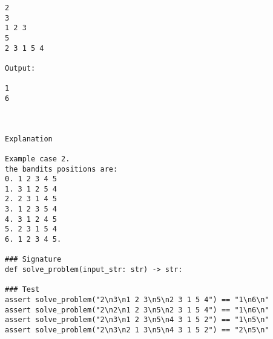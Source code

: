 \documentclass{article}
\begin{document}
\begin{lstlisting}[language={}]
2
3
1 2 3
5
2 3 1 5 4

Output:

1
6



Explanation

Example case 2.
the bandits positions are:
0. 1 2 3 4 5
1. 3 1 2 5 4
2. 2 3 1 4 5
3. 1 2 3 5 4
4. 3 1 2 4 5
5. 2 3 1 5 4
6. 1 2 3 4 5.

### Signature
def solve_problem(input_str: str) -> str:

### Test
assert solve_problem("2\n3\n1 2 3\n5\n2 3 1 5 4") == "1\n6\n"
assert solve_problem("2\n2\n1 2 3\n5\n2 3 1 5 4") == "1\n6\n"
assert solve_problem("2\n3\n1 2 3\n5\n4 3 1 5 2") == "1\n5\n"
assert solve_problem("2\n3\n2 1 3\n5\n4 3 1 5 2") == "2\n5\n"
\end{lstlisting}
\end{document}
